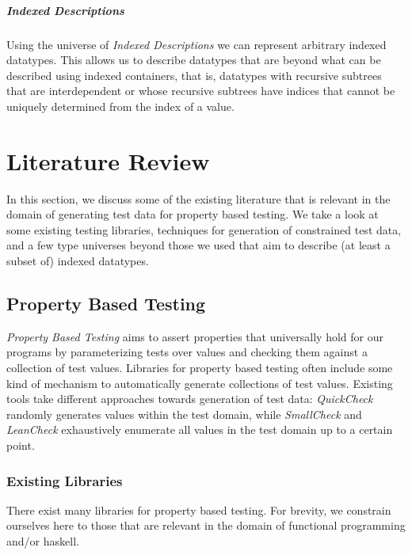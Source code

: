 \documentclass[a4paper,msc,twosized=semi]{uustthesis}
\begin{document}
  \paragraph{Indexed Descriptions}
    Using the universe of \emph{Indexed Descriptions} \cite{dagand2013cosmology}
    we can represent arbitrary indexed datatypes. This allows us to describe 
    datatypes that are beyond what can be described using indexed containers, 
    that is, datatypes with recursive subtrees that are interdependent or whose 
    recursive subtrees have indices that cannot be uniquely determined from the 
    index of a value. 

\chapter{Literature Review}
In this section, we discuss some of the existing literature that is relevant in the domain of generating test data for property based testing. We take a look at some existing testing libraries, techniques for generation of constrained test data, and a few type universes beyond those we used that aim to describe (at least a subset of) indexed datatypes. 

\section{Property Based Testing}

  \textit{Property Based Testing} aims to assert properties that universally hold 
  for our programs by parameterizing tests over values and checking them against a 
  collection of test values. Libraries for property based testing often include some 
  kind of mechanism to automatically generate collections of test values. Existing 
  tools take different approaches towards generation of test data: \textit
  {QuickCheck} \cite{claessen2011quickcheck} randomly generates values within the 
  test domain, while \textit{SmallCheck} \cite{runciman2008smallcheck} and \textit
  {LeanCheck} \cite{matela2017tools} exhaustively enumerate all values in the test 
  domain up to a certain point. 

\subsection{Existing Libraries}

  There exist many libraries for property based testing. For brevity, we constrain ourselves here to those that are relevant in the domain of functional programming and/or haskell. 
\end{document}
